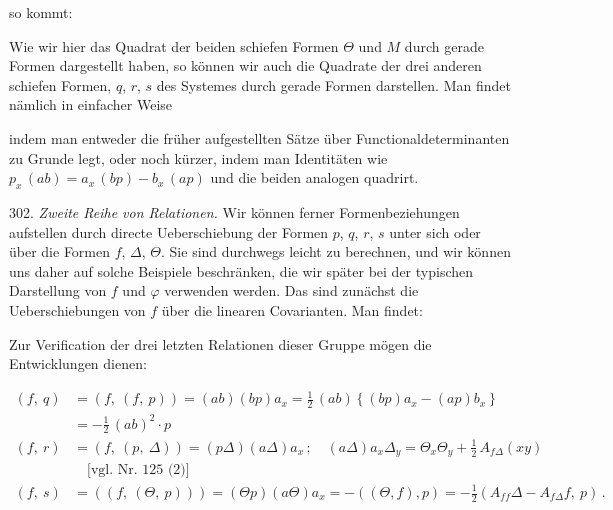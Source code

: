 so kommt:

Wie wir hier das Quadrat der beiden schiefen Formen $\Theta$ und $M$ durch
gerade Formen dargestellt haben, so können wir auch die Quadrate der drei
anderen schiefen Formen, $q$, $r$, $s$ des Systemes durch gerade Formen
darstellen. Man findet nämlich in einfacher Weise

indem man entweder die früher aufgestellten Sätze über
Functionaldeterminanten zu Grunde legt, oder noch kürzer, indem man
Identitäten wie $p_x\,(ab) = a_x\,(bp) - b_x\,(ap)$ und die beiden analogen
quadrirt.

302. \textit{Zweite Reihe von Relationen.} Wir können ferner
Formenbeziehungen aufstellen durch directe Ueberschiebung der Formen $p$,
$q$, $r$, $s$ unter sich oder über die Formen $f$, $\Delta$, $\Theta$. Sie
sind durchwegs leicht zu berechnen, und wir können uns daher auf solche
Beispiele beschränken, die wir später bei der typischen Darstellung von $f$
und $\varphi$ verwenden werden. Das sind zunächst die Ueberschiebungen von
$f$ über die linearen Covarianten. Man findet:

Zur Verification der drei letzten Relationen dieser Gruppe mögen die
Entwicklungen dienen:

\[
\begin{aligned}
(f,\ q) &= (f,\ (f,\ p)) = (ab)(bp)a_x = \tfrac{1}{2}\,(ab)\left\{(bp)a_x -
(ap)b_x\right\}\\
&= -\tfrac{1}{2}\,(ab)^2\cdot p\\
(f,\ r) &= (f,\ (p,\ \Delta)) = (p\Delta)(a\Delta)a_x\,;\quad
(a\Delta)a_x\Delta_y = \Theta_x\Theta_y + \tfrac{1}{2}\,A_{f\Delta}(xy)\\
&\quad\text{[vgl. Nr. 125 (2)]}\\
(f,\ s) &= ((f,\ (\Theta,\ p))) = (\Theta p)(a\Theta)a_x = -((\Theta,f),p) =
-\tfrac{1}{2}(A_{ff}\Delta - A_{f\Delta}f,\ p)\,.
\end{aligned}
\]

